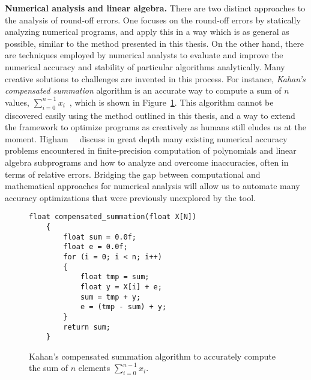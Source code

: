 \textbf{Numerical analysis and linear algebra.}  There are two distinct
approaches to the analysis of round-off errors.  One focuses on the round-off
errors by statically analyzing numerical programs, and apply this in a way
which is as general as possible, similar to the method presented in this
thesis.  On the other hand, there are techniques employed by numerical analysts
to evaluate and improve the numerical accuracy and stability of particular
algorithms analytically.  Many creative solutions to challenges are invented
in this process.  For instance, \emph{Kahan's compensated summation} algorithm
is an accurate way to compute a sum of $n$ values, $\sum_{i = 0}^{n-1}
x_i$~\cite{kahan65}, which is shown in Figure~\ref{co:lst:sum}.  This algorithm
cannot be discovered easily using the method outlined in this thesis, and a
way to extend the framework to optimize programs as creatively as humans still
eludes us at the moment.  Higham~\etal~\cite{higham02} discuss in great depth
many existing numerical accuracy problems encountered in finite-precision
computation of polynomials and linear algebra subprograms and how to analyze
and overcome inaccuracies, often in terms of relative errors.  Bridging the
gap between computational and mathematical approaches for numerical analysis
will allow us to automate many accuracy optimizations that were previously
unexplored by the tool.
\begin{figure}[ht]
    \centering
\begin{lstlisting}[]
    float compensated_summation(float X[N])
    {
        float sum = 0.0f;
        float e = 0.0f;
        for (i = 0; i < n; i++)
        {
            float tmp = sum;
            float y = X[i] + e;
            sum = tmp + y;
            e = (tmp - sum) + y;
        }
        return sum;
    }
\end{lstlisting}
    \caption{%
        Kahan's compensated summation algorithm to accurately compute the sum
        of $n$ elements $\sum_{i = 0}^{n-1} x_i$.
    }\label{co:lst:sum}
\end{figure}

